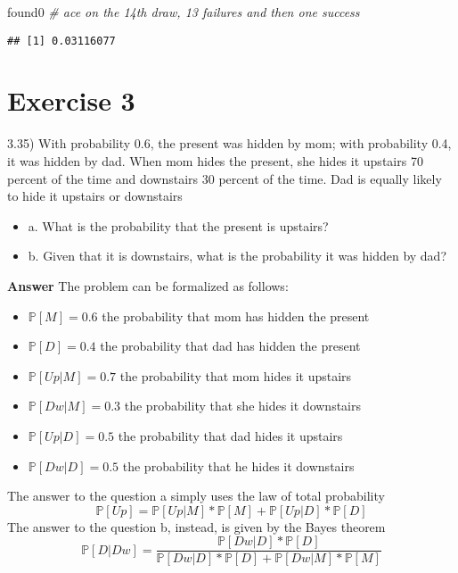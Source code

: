 \documentclass[
]{article}
\newenvironment{Shaded}{\begin{snugshade}}{\end{snugshade}}
\newcommand{\CommentTok}[1]{\textcolor[rgb]{0.56,0.35,0.01}{\textit{#1}}}
\newcommand{\NormalTok}[1]{#1}
\providecommand{\tightlist}{%
  \setlength{\itemsep}{0pt}\setlength{\parskip}{0pt}}
\begin{document}
\begin{Shaded}
\begin{Highlighting}[]
\NormalTok{found0 }\CommentTok{\# ace on the 14th draw, 13 failures and then one success}
\end{Highlighting}
\end{Shaded}

\begin{verbatim}
## [1] 0.03116077
\end{verbatim}

\hypertarget{exercise-3}{%
\section{Exercise 3}\label{exercise-3}}

3.35) With probability 0.6, the present was hidden by mom; with
probability 0.4, it was hidden by dad. When mom hides the present, she
hides it upstairs 70 percent of the time and downstairs 30 percent of
the time. Dad is equally likely to hide it upstairs or downstairs

\begin{itemize}
\tightlist
\item
  a. What is the probability that the present is upstairs?
\item
  b. Given that it is downstairs, what is the probability it was hidden
  by dad?
\end{itemize}

\textbf{Answer} The problem can be formalized as follows:

\begin{itemize}
\tightlist
\item
  \(\mathbb P[M]=0.6\) the probability that mom has hidden the present
\item
  \(\mathbb P[D]=0.4\) the probability that dad has hidden the present
\item
  \(\mathbb P[Up|M]=0.7\) the probability that mom hides it upstairs
\item
  \(\mathbb P[Dw|M]=0.3\) the probability that she hides it downstairs
\item
  \(\mathbb P[Up|D]=0.5\) the probability that dad hides it upstairs
\item
  \(\mathbb P[Dw|D]=0.5\) the probability that he hides it downstairs
\end{itemize}

The answer to the question a simply uses the law of total probability
\[\mathbb P[Up]=\mathbb P[Up|M]*\mathbb P[M] + \mathbb P[Up|D]*\mathbb P[D]\]
The answer to the question b, instead, is given by the Bayes theorem
\[\mathbb P[D|Dw]=\frac{\mathbb P[Dw|D]*\mathbb P[D]}{\mathbb P[Dw|D]*\mathbb P[D]+\mathbb P[Dw|M]*\mathbb P[M]}\]
\end{document}
